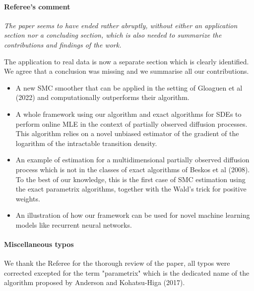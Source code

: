 \documentclass{article}
\begin{document}
\paragraph{Referee's comment} \textit{The paper seems to have ended rather abruptly, without either an application section nor a concluding section, which is also needed to summarize the contributions and findings of the work.}

The application to real data is now a separate section which is clearly identified. We agree that a conclusion was missing and we summarise all our contributions.

\begin{itemize}
    \item A new SMC smoother that can be applied in the setting of Gloaguen et al (2022) and computationally outperforms  their algorithm.
    \item A whole framework using our algorithm and exact algorithms for SDEs to perform online MLE in the context of partially observed diffusion processes. This algorithm relies on a novel unbiased estimator of the gradient of the logarithm of the intractable transition density.
    \item An example of estimation for a multidimensional partially observed diffusion process which is not in the classes of exact algorithms of Beskos et al (2008). To the best of our knowledge, this is the first case of SMC estimation using the exact parametrix algorithms, together with the Wald's trick for positive weights.
    \item An illustration of how our framework can be used for novel machine learning models like recurrent neural networks.
\end{itemize}


\paragraph{Miscellaneous typos}
 We thank the Referee for the thorough review of the paper, all typos were corrected excepted for the term "parametrix" which is the dedicated name of the algorithm proposed by Anderson and Kohatsu-Higa (2017).
\end{document}

